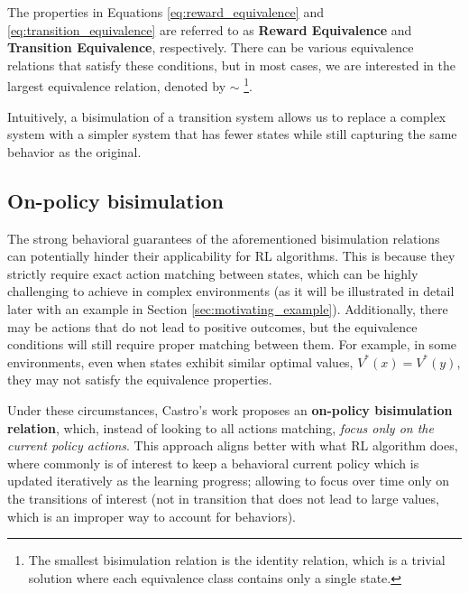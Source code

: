 The properties in Equations \ref{eq:reward_equivalence} and \ref{eq:transition_equivalence} are referred to as \textbf{Reward Equivalence} and \textbf{Transition Equivalence}, respectively. There can be various equivalence relations that satisfy these conditions, but in most cases, we are interested in the largest equivalence relation, denoted by $\sim$ \footnote{The smallest bisimulation relation is the identity relation, which is a trivial solution where each equivalence class contains only a single state.}.

Intuitively, a bisimulation of a transition system allows us to replace a complex system with a simpler system that has fewer states while still capturing the same behavior as the original.

\subsection{On-policy bisimulation}

The strong behavioral guarantees of the aforementioned bisimulation relations can potentially hinder their applicability for RL algorithms. This is because they strictly require exact action matching between states, which can be highly challenging to achieve in complex environments (as it will be illustrated in detail later with an example in Section \ref{sec:motivating_example}). Additionally, there may be actions that do not lead to positive outcomes, but the equivalence conditions will still require proper matching between them. For example, in some environments, even when states exhibit similar optimal values, $V^*(x) = V^*(y)$, they may not satisfy the equivalence properties.


Under these circumstances, Castro's work \cite{castro2020scalable} proposes an \textbf{on-policy bisimulation relation}, which, instead of looking to all actions matching, \textit{focus only on the current policy actions}. This approach aligns better with what RL algorithm does, where commonly is of interest to keep a behavioral current policy which is updated iteratively as the learning progress; allowing to focus over time only on the transitions of interest (not in transition that does not lead to large values, which is an improper way to account for behaviors).

